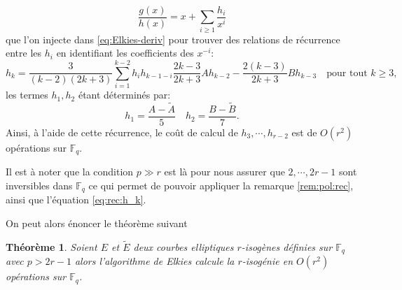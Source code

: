 \documentclass[10pt,a4paper]{book}
\theoremstyle{plain}
\newtheorem{thm}{Théorème}[chapter]
\theoremstyle{definition}
\theoremstyle{definition}
\theoremstyle{definition}
\theoremstyle{definition}
\theoremstyle{remark}
\theoremstyle{remark}
\theoremstyle{definition}
\begin{document}
\begin{equation}
\label{eq:iso:frac}
\frac{g(x)}{h(x)}=x+ \sum_{i\geqslant 1} \frac{h_i}{x^i}
\end{equation}
que l'on injecte dans \eqref{eq:Elkies-deriv} pour trouver des relations de récurrence entre les $h_i$ en identifiant les coefficients des $x^{-i}$:
\begin{equation}
\label{eq:rec:h_k}
h_k=\frac{3}{(k-2)(2k+3)}\sum_{i=1}^{k-2}h_ih_{k-1-i}\frac{2k-3}{2k+3}Ah_{k-2}-\frac{2(k-3)}{2k+3}Bh_{k-3} \quad \text{pour tout } k \geqslant 3,
\end{equation}
les termes $h_1,h_2$ étant déterminés par:
\begin{equation}
h_1=\frac{A-\tilde{A}}{5} \quad h_2={\frac{B-\tilde{B}}{7}}.
\end{equation}
Ainsi, à l'aide de cette récurrence, le coût de calcul de $h_3, \cdots , h_{r-2}$ est de $O(r^2)$ opérations sur $\mathbb{F}_q$. 

Il est à noter que la condition $p \gg r$ est là pour nous assurer que $2, \cdots, 2r-1$ sont inversibles dans $\mathbb{F}_q$ ce qui permet de pouvoir appliquer la remarque \ref{rem:pol:rec}, ainsi que l'équation \eqref{eq:rec:h_k}.

On peut alors énoncer le théorème suivant
\begin{thm}
Soient $E$ et $\tilde{E}$ deux courbes elliptiques $r$-isogènes définies sur
$\mathbb{F}_q$ avec $p>2r-1$ alors l'algorithme de Elkies calcule la 
$r$-isogénie en $O(r^2)$ opérations sur $\mathbb{F}_q$.
\end{thm}
\end{document}
